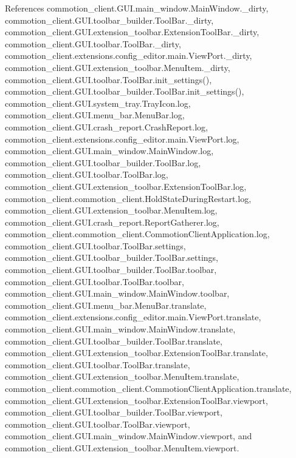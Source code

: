 References commotion\+\_\+client.\+G\+U\+I.\+main\+\_\+window.\+Main\+Window.\+\_\+dirty, commotion\+\_\+client.\+G\+U\+I.\+toolbar\+\_\+builder.\+Tool\+Bar.\+\_\+dirty, commotion\+\_\+client.\+G\+U\+I.\+extension\+\_\+toolbar.\+Extension\+Tool\+Bar.\+\_\+dirty, commotion\+\_\+client.\+G\+U\+I.\+toolbar.\+Tool\+Bar.\+\_\+dirty, commotion\+\_\+client.\+extensions.\+config\+\_\+editor.\+main.\+View\+Port.\+\_\+dirty, commotion\+\_\+client.\+G\+U\+I.\+extension\+\_\+toolbar.\+Menu\+Item.\+\_\+dirty, commotion\+\_\+client.\+G\+U\+I.\+toolbar.\+Tool\+Bar.\+init\+\_\+settings(), commotion\+\_\+client.\+G\+U\+I.\+toolbar\+\_\+builder.\+Tool\+Bar.\+init\+\_\+settings(), commotion\+\_\+client.\+G\+U\+I.\+system\+\_\+tray.\+Tray\+Icon.\+log, commotion\+\_\+client.\+G\+U\+I.\+menu\+\_\+bar.\+Menu\+Bar.\+log, commotion\+\_\+client.\+G\+U\+I.\+crash\+\_\+report.\+Crash\+Report.\+log, commotion\+\_\+client.\+extensions.\+config\+\_\+editor.\+main.\+View\+Port.\+log, commotion\+\_\+client.\+G\+U\+I.\+main\+\_\+window.\+Main\+Window.\+log, commotion\+\_\+client.\+G\+U\+I.\+toolbar\+\_\+builder.\+Tool\+Bar.\+log, commotion\+\_\+client.\+G\+U\+I.\+toolbar.\+Tool\+Bar.\+log, commotion\+\_\+client.\+G\+U\+I.\+extension\+\_\+toolbar.\+Extension\+Tool\+Bar.\+log, commotion\+\_\+client.\+commotion\+\_\+client.\+Hold\+State\+During\+Restart.\+log, commotion\+\_\+client.\+G\+U\+I.\+extension\+\_\+toolbar.\+Menu\+Item.\+log, commotion\+\_\+client.\+G\+U\+I.\+crash\+\_\+report.\+Report\+Gatherer.\+log, commotion\+\_\+client.\+commotion\+\_\+client.\+Commotion\+Client\+Application.\+log, commotion\+\_\+client.\+G\+U\+I.\+toolbar.\+Tool\+Bar.\+settings, commotion\+\_\+client.\+G\+U\+I.\+toolbar\+\_\+builder.\+Tool\+Bar.\+settings, commotion\+\_\+client.\+G\+U\+I.\+toolbar\+\_\+builder.\+Tool\+Bar.\+toolbar, commotion\+\_\+client.\+G\+U\+I.\+toolbar.\+Tool\+Bar.\+toolbar, commotion\+\_\+client.\+G\+U\+I.\+main\+\_\+window.\+Main\+Window.\+toolbar, commotion\+\_\+client.\+G\+U\+I.\+menu\+\_\+bar.\+Menu\+Bar.\+translate, commotion\+\_\+client.\+extensions.\+config\+\_\+editor.\+main.\+View\+Port.\+translate, commotion\+\_\+client.\+G\+U\+I.\+main\+\_\+window.\+Main\+Window.\+translate, commotion\+\_\+client.\+G\+U\+I.\+toolbar\+\_\+builder.\+Tool\+Bar.\+translate, commotion\+\_\+client.\+G\+U\+I.\+extension\+\_\+toolbar.\+Extension\+Tool\+Bar.\+translate, commotion\+\_\+client.\+G\+U\+I.\+toolbar.\+Tool\+Bar.\+translate, commotion\+\_\+client.\+G\+U\+I.\+extension\+\_\+toolbar.\+Menu\+Item.\+translate, commotion\+\_\+client.\+commotion\+\_\+client.\+Commotion\+Client\+Application.\+translate, commotion\+\_\+client.\+G\+U\+I.\+extension\+\_\+toolbar.\+Extension\+Tool\+Bar.\+viewport, commotion\+\_\+client.\+G\+U\+I.\+toolbar\+\_\+builder.\+Tool\+Bar.\+viewport, commotion\+\_\+client.\+G\+U\+I.\+toolbar.\+Tool\+Bar.\+viewport, commotion\+\_\+client.\+G\+U\+I.\+main\+\_\+window.\+Main\+Window.\+viewport, and commotion\+\_\+client.\+G\+U\+I.\+extension\+\_\+toolbar.\+Menu\+Item.\+viewport.


